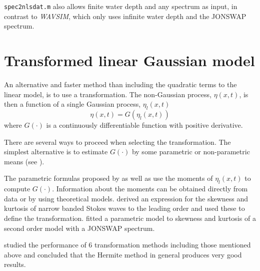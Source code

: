 \verb+spec2nlsdat.m+ also allows finite water depth and any spectrum
as input, in contrast to
\textit{WAVSIM}, which only uses infinite water depth and the JONSWAP spectrum.

\section{Transformed linear Gaussian model}
\label{sec:transf-line-gauss}
An alternative and faster method than including the quadratic terms to
the linear model, is to use a transformation.
The non-Gaussian process, $\eta(x,t)$,
is then a function of a single Gaussian process, $\eta_{l}(x,t)$
\begin{equation} \label{eq:tran1}
  \eta(x,t)=G(\eta_{l}(x,t))
\end{equation}
where $G(\cdot)$ is a continuously differentiable function with positive
derivative.

There are several ways to proceed when selecting the
transformation. The simplest alternative is to estimate $G(\cdot)$
by some parametric or non-parametric means
(see \eg{} \cite{Winterstein1988Nonlinear,OchiAndAhn1994NonGaussian,RychlikEtal1997Modelling}).

The parametric formulas proposed by \cite{OchiAndAhn1994NonGaussian} as well as
\cite{Winterstein1988Nonlinear} use the moments of $\eta_{l}(x,t)$ to compute
$G(\cdot)$. Information about the moments can be obtained directly
from data or by using theoretical models.
\cite{MarthinsenAndWinterstein1992Skewness} derived an expression for the
skewness and kurtosis of narrow banded Stokes waves to the leading
order and used these to define the
transformation. \cite{WintersteinAndJha1995Random} fitted a
parametric model to skewness
and kurtosis of a second order model with a JONSWAP spectrum.

\cite{Machado2003Probability} studied the performance of 6
transformation methods including those mentioned above and concluded
that the Hermite method in general produces very good results.

